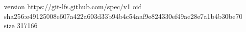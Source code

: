 version https://git-lfs.github.com/spec/v1
oid sha256:e49125008e607a422a603d33b94b4c54aaf9e824330ef49ae28e7a1b4b30be70
size 317166
